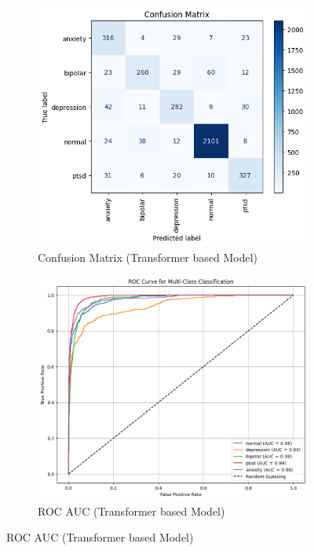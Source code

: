 \begin{figure}[h!]
    \centering
    \begin{subfigure}[b]{0.49\textwidth}
        \centering
        \includegraphics[width=\textwidth]{Images/T CM.png}
        \caption*{Confusion Matrix (Transformer based Model)}
        \label{dfdl145}  %
    \end{subfigure}
    \hfill
    \begin{subfigure}[b]{0.49\textwidth}
        \centering
        \includegraphics[width=\textwidth]{Images/T ROC.png}
        \caption*{ROC AUC (Transformer based Model)}
        \label{dfdl146}  %
    \end{subfigure}
    \label{fig:transformer_comparison}
\end{figure}


